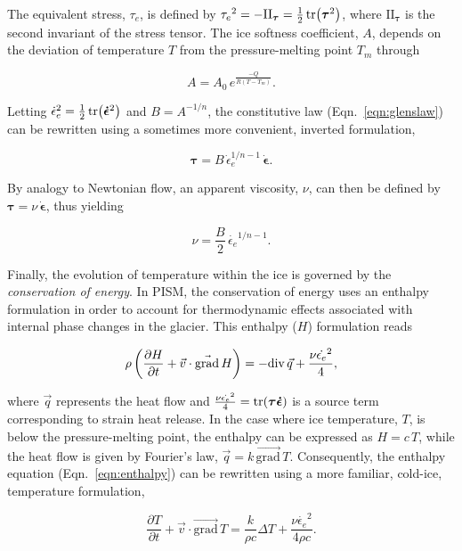 \documentclass{article}
\renewcommand{\div}[1]{\mathrm{div}\,#1}
\renewcommand{\grad}[1]{\vec{\mathrm{grad}}\,#1}
\newcommand{\eqn}[1]{Eqn.~\ref{eqn:#1}}
\begin{document}
The equivalent stress, $\tau_e$, is defined by
${\tau_e}^2 = -\mathrm{II}_{\bm{\tau}} = \frac{1}{2} \tr(\bm{\tau}^2)$,
where $\mathrm{II}_{\bm{\tau}}$ is the second invariant of the stress tensor.
The ice softness coefficient, $A$, depends on the deviation of temperature $T$
from the pressure-melting point $T_m$ through

\begin{equation}
    A = A_0\,e^\frac{-Q}{R(T-T_m)}.
\end{equation}

Letting ${\dot\epsilon_e}^2 = \frac{1}{2} \tr(\bm{\dot\epsilon}^2)$ and
$B=A^{-1/n}$, the constitutive law (\eqn{glenslaw}) can be rewritten using a
sometimes more convenient, inverted formulation,

\begin{equation}
    \bm{\tau} = B\,\dot{\epsilon}_e^{1/n-1}\,\bm{\dot\epsilon}.
\end{equation}

By analogy to Newtonian flow, an apparent viscosity, $\nu$, can then be defined
by $\bm{\tau} = \nu\,\bm{\dot\epsilon}$, thus yielding

\begin{equation}
    \label{eqn:viscosity}
    \nu = \frac{B}{2}\,\dot{\epsilon_e}^{1/n-1}.
\end{equation}

Finally, the evolution of temperature within the ice is governed by the
\emph{conservation of energy}. In PISM, the conservation of energy uses an
enthalpy formulation in order to account for thermodynamic effects associated
with internal phase changes in the glacier. This enthalpy ($H$) formulation
reads

\begin{equation}
    \label{eqn:enthalpy}
    \rho \left(\pdv{H}{t} + \vec{v} \cdot \grad{H} \right)
        = -\div{\vec{q}} + \frac{\nu\dot{\epsilon_e}^2}{4},
\end{equation}


where $\vec{q}$ represents the heat flow and
${\frac{\nu\dot{\epsilon_e}^2}{4} = \tr(\bm{\tau}\bm{\dot\epsilon})}$ is a
source term corresponding to strain heat release. In the case where ice
temperature, $T$, is below the pressure-melting point, the enthalpy can be
expressed as $H=c\,T$, while the heat flow is given by Fourier's law,
$\vec{q} = k\,\grad{T}$. Consequently, the enthalpy equation (\eqn{enthalpy})
can be rewritten using a more familiar, cold-ice, temperature formulation,

\begin{equation}
    \label{eqn:temperature}
    \frac{\partial T}{\partial t}
        + \vec{v} \cdot \vec{\mathrm{grad}}\,T
        = \frac{k}{\rho c} \Delta T
        + \frac{\nu\dot{\epsilon_e}^2}{4\rho c}.
\end{equation}
\end{document}
